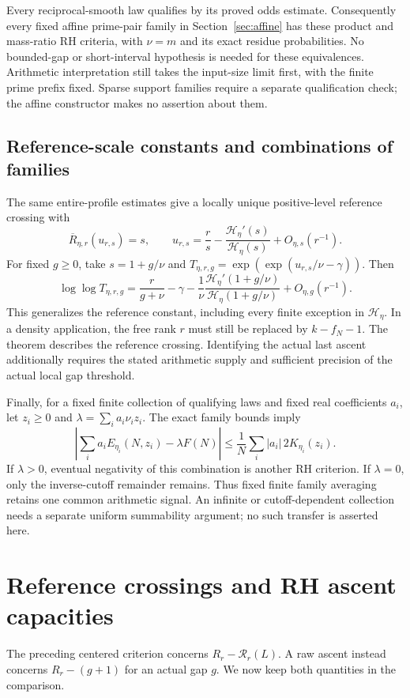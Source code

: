 \documentclass[11pt]{article}
\theoremstyle{definition}
\begin{document}
Every reciprocal-smooth law qualifies by its proved odds estimate.
Consequently every fixed affine prime-pair family in
Section~\ref{sec:affine} has these product and mass-ratio RH criteria,
with $\nu=m$ and its exact residue probabilities.
No bounded-gap or short-interval hypothesis is needed for these
equivalences. Arithmetic interpretation still takes the input-size
limit first, with the finite prime prefix fixed. Sparse support
families require a separate qualification check; the affine
constructor makes no assertion about them.

\subsection{Reference-scale constants and combinations of families}
The same entire-profile estimates give a locally unique positive-level
reference crossing with
\[
 \overline R_{\eta,r}(u_{r,s})=s,\qquad
 u_{r,s}=\frac r s-\frac{\mathcal H_\eta'(s)}{\mathcal H_\eta(s)}
          +O_{\eta,s}(r^{-1}).
\]
For fixed $g\ge0$, take $s=1+g/\nu$ and
$T_{\eta,r,g}=\exp(\exp(u_{r,s}/\nu-\gamma))$. Then
\begin{equation}\label{eq:family-reference-constant}
 \log\log T_{\eta,r,g}
 =\frac r{g+\nu}-\gamma
   -\frac1\nu\frac{\mathcal H_\eta'(1+g/\nu)}
                    {\mathcal H_\eta(1+g/\nu)}
   +O_{\eta,g}(r^{-1}).
\end{equation}
This generalizes the reference constant, including every finite
exception in $\mathcal H_\eta$. In a density application, the free
rank $r$ must still be replaced by $k-f_N-1$.
The theorem describes the reference crossing. Identifying the actual
last ascent additionally requires the stated arithmetic supply and
sufficient precision of the actual local gap threshold.

Finally, for a fixed finite collection of qualifying laws and fixed
real coefficients $a_i$, let $z_i\ge0$ and $\lambda=\sum_i a_i\nu_i z_i$.
The exact family bounds imply
\[
 \left|\sum_i a_iE_{\eta_i}(N,z_i)-\lambda F(N)\right|
 \le\frac1N\sum_i |a_i|\,2K_{\eta_i}(z_i).
\]
If $\lambda>0$, eventual negativity of this combination is another RH
criterion. If $\lambda=0$, only the inverse-cutoff remainder remains.
Thus fixed finite family averaging retains one common arithmetic
signal. An infinite or cutoff-dependent collection needs a separate
uniform summability argument; no such transfer is asserted here.

\section{Reference crossings and RH ascent capacities}\label{sec:capacity}
The preceding centered criterion concerns $R_r-\mathcal R_r(L)$.
A raw ascent instead concerns $R_r-(g+1)$ for an actual gap $g$.
We now keep both quantities in the comparison.
\end{document}
